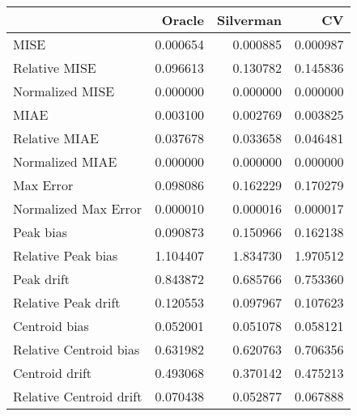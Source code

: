\begin{tabular}{lrrr}
  \hline
 & Oracle & Silverman & CV \\ 
  \hline
MISE & 0.000654 & 0.000885 & 0.000987 \\ 
  Relative MISE & 0.096613 & 0.130782 & 0.145836 \\ 
  Normalized MISE & 0.000000 & 0.000000 & 0.000000 \\ 
  MIAE & 0.003100 & 0.002769 & 0.003825 \\ 
  Relative MIAE & 0.037678 & 0.033658 & 0.046481 \\ 
  Normalized MIAE & 0.000000 & 0.000000 & 0.000000 \\ 
  Max Error & 0.098086 & 0.162229 & 0.170279 \\ 
  Normalized Max Error & 0.000010 & 0.000016 & 0.000017 \\ 
  Peak bias & 0.090873 & 0.150966 & 0.162138 \\ 
  Relative Peak bias & 1.104407 & 1.834730 & 1.970512 \\ 
  Peak drift & 0.843872 & 0.685766 & 0.753360 \\ 
  Relative Peak drift & 0.120553 & 0.097967 & 0.107623 \\ 
  Centroid bias & 0.052001 & 0.051078 & 0.058121 \\ 
  Relative Centroid bias & 0.631982 & 0.620763 & 0.706356 \\ 
  Centroid drift & 0.493068 & 0.370142 & 0.475213 \\ 
  Relative Centroid drift & 0.070438 & 0.052877 & 0.067888 \\ 
   \hline
\end{tabular}
